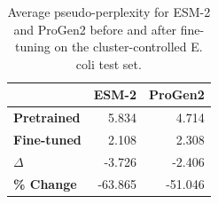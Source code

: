 \begin{table}[t]
\centering
\caption{Average pseudo-perplexity for ESM-2 and ProGen2 before and after fine-tuning on the cluster-controlled E. coli test set.}
\label{tab:ecoli_pseudoperplexity_cluster95}
\begin{tabular}{lrr}
\hline
 & \textbf{ESM-2} & \textbf{ProGen2} \\
\hline
\textbf{Pretrained} & 5.834 & 4.714 \\
\textbf{Fine-tuned} & 2.108 & 2.308 \\
\textbf{$\Delta$} & -3.726 & -2.406 \\
\textbf{\% Change} & -63.865 & -51.046 \\
\hline
\end{tabular}
\end{table}
